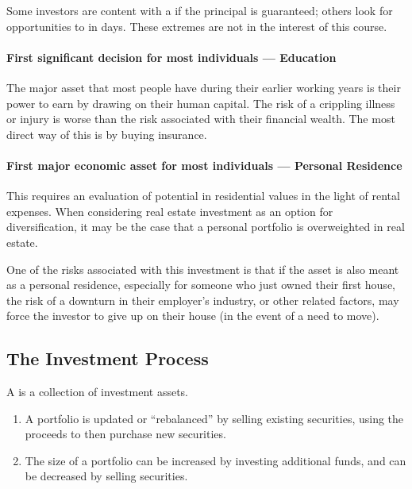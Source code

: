 \documentclass[notoc,notitlepage]{tufte-book}
\begin{document}
Some investors are content with a 
if the principal is guaranteed; others look for opportunities to
 in days.
These extremes are not in the interest of this course.

\paragraph{First significant decision for most individuals --- Education}

The major asset that most people have during their earlier working years
is their power to earn by drawing on their human capital.
The risk of a crippling illness or injury is worse than the risk
associated with their financial wealth.
The most direct way of  this is by buying insurance.

\paragraph{First major economic asset for most individuals --- Personal Residence} 

This requires an evaluation of potential  in residential
values in the light of rental expenses.
When considering real estate investment as an option for diversification,
it may be the case that a personal portfolio is overweighted in real estate.

One of the risks associated with this investment is that
if the asset is also meant as a personal residence,
especially for someone who just owned their first house,
the risk of a downturn in their employer's industry, or other related factors,
may force the investor to give up on their house
(in the event of a need to move).


\subsection{The Investment Process}%
\label{sub:the_investment_process}

\begin{defn}[Portfolio]\label{defn:portfolio}
  A  is a collection of investment assets.
\end{defn}

\begin{remark}
  \begin{enumerate}
    \item A portfolio is updated or ``rebalanced'' by selling existing
      securities,
      using the proceeds to then purchase new securities.
    \item The size of a portfolio can be increased by investing additional
      funds,
      and can be decreased by selling securities.
  \end{enumerate}
\end{remark}
\end{document}
